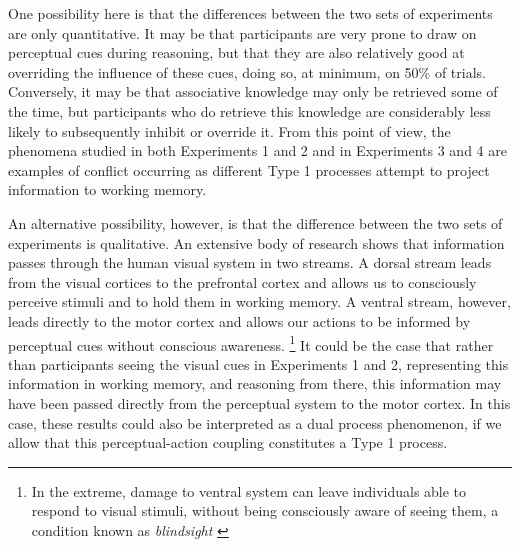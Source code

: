 One possibility here is that
the differences between the two sets of experiments are only quantitative.
It may be that participants are very prone to
draw on perceptual cues during reasoning,
but that they are also relatively good at
overriding the influence of these cues,
doing so, at minimum, on 50\% of trials.
Conversely, it may be that
associative knowledge may only be retrieved some of the time,
but participants who do retrieve this knowledge are
considerably less likely to subsequently inhibit or override it.
From this point of view, the phenomena studied in
both Experiments 1 and 2 and in Experiments 3 and 4
are examples of conflict occurring as different Type 1 processes
attempt to project information to working memory.

An alternative possibility, however, is that
the difference between the two sets of experiments is qualitative.
An extensive body of research \citep[see][for a review]{Goodale2004}
shows that information passes through the human visual system in two streams.
A dorsal stream leads from the visual cortices
to the prefrontal cortex and allows us to
consciously perceive stimuli and to hold them in working memory.
A ventral stream, however, leads directly to the motor cortex
and allows our actions to be informed by perceptual cues
without conscious awareness.%
\footnote{
  In the extreme, damage to ventral system
  can leave individuals able to respond to visual stimuli,
  without being consciously aware of seeing them,
  a condition known as \emph{blindsight} \citep{Weiskrantz1986,Salti2015}
}
It could be the case that
rather than participants seeing the visual cues in Experiments 1 and 2,
representing this information in working memory,
and reasoning from there,
this information may have been passed directly
from the perceptual system to the motor cortex.
In this case, these results could also be interpreted as a dual process phenomenon,
if we allow that this perceptual-action coupling constitutes a Type 1 process.

